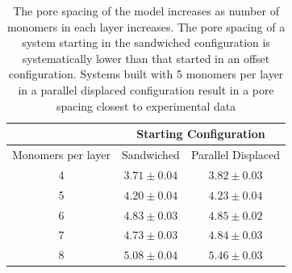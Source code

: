 \documentclass{article}
\begin{document}
  \begin{table}[h]
  \centering
  \begin{tabular}{ccc}
  \toprule
  		   & \multicolumn{2}{c}{Starting Configuration} \\
  \hline
  Monomers per layer & Sandwiched & Parallel Displaced \\
  \midrule
  4 & $3.71 \pm 0.04$ & $3.82 \pm 0.03$ \\
  5 & $4.20 \pm 0.04$ & $4.23 \pm 0.04$ \\
  6 & $4.83 \pm 0.03$ & $4.85 \pm 0.02$ \\
  7 & $4.73 \pm 0.03$ & $4.84 \pm 0.03$ \\
  8 & $5.08 \pm 0.04$ & $5.46 \pm 0.03$ \\
  \bottomrule
  \end{tabular}
  \caption{The pore spacing of the model increases as number of monomers
  in each layer increases. The pore spacing of a system starting in the 
  sandwiched configuration is systematically lower than that started in an 
  offset configuration. Systems built with 5 monomers per layer in a parallel
  displaced configuration result in a pore spacing closest to experimental
  data}\label{table:p2p} 
  \end{table}
  
\end{document}
